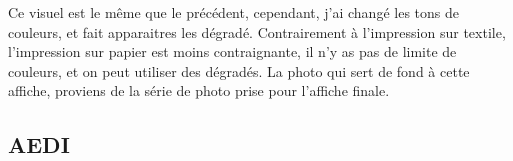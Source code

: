             \begin{center}    
            \end{center}
            Ce visuel est le même que le précédent, cependant, j'ai changé les tons de couleurs, et fait apparaitres les dégradé. Contrairement à l'impression sur textile, l'impression sur papier est moins contraignante, il n'y as pas de limite de couleurs, et on peut utiliser des dégradés.
                La photo qui sert de fond à cette affiche, proviens de la série de photo prise pour l'affiche finale.
            
    \subsection{AEDI}
            
